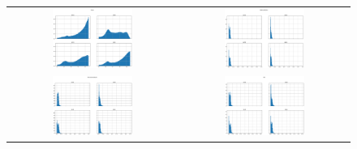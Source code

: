 \begin{figure}[h!]
\begin{tabular}{cc}

\includegraphics[width=0.49\textwidth]{Kap6/features/feature_comparison_34.png} & \includegraphics[width=0.49\textwidth]{Kap6/features/feature_comparison_35.png}  \\

\includegraphics[width=0.49\textwidth]{Kap6/features/feature_comparison_38.png}  & \includegraphics[width=0.49\textwidth]{Kap6/features/feature_comparison_48.png}  \\


\end{tabular}
\end{figure}
